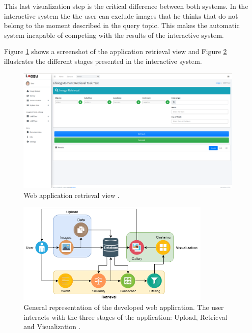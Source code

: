 This last visualization step is the critical difference between both systems. In the interactive system the the user can exclude images that he thinks that do not belong to the moment described in the query topic. This makes the automatic system incapable of competing with the results of the interactive system.

Figure \ref{fig:app_view} shows a screenshot of the application retrieval view and Figure \ref{fig:app_diagram} illustrates the different stages presented in the interactive system. 

\begin{figure}[H]
  \centering
  \captionsetup{justification=centering}

  \includegraphics[width=\textwidth]{Sections/7Results/images/retrievalview.png} 
  \caption[Web application retrievable view] {Web application retrieval view \cite{Ribeiro2020}.}
  \label{fig:app_view}
\end{figure}

\begin{figure}[H]
  \centering
  \captionsetup{justification=centering}

  \includegraphics[width=0.85\textwidth]{Sections/7Results/images/Appdiagram.png} 
  \caption[General representation of the  developed  web  application.]{General representation of the  developed  web  application.  The  user  interacts with the three stages of the application: Upload, Retrieval and Visualization \cite{Ribeiro2020}.}
  \label{fig:app_diagram}
\end{figure}


